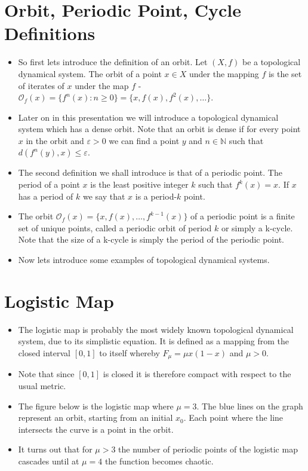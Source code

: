 \documentclass{article}
\begin{document}
    \section{Orbit, Periodic Point, Cycle Definitions}
    \begin{itemize}
        \item So first lets introduce the definition of an orbit. Let $(X, f)$ be a topological dynamical system. The orbit of a point $x \in X$ under the mapping $f$ is the set of iterates of $x$ under the map $f$ - $\mathcal{O}_f(x) = \lbrace f^n(x) : n \geq 0 \rbrace = \lbrace x, f(x), f^2(x), \dots \rbrace$. 
        \item Later on in this presentation we will introduce a topological dynamical system which has a dense orbit. Note that an orbit is dense if for every point $x$ in the orbit and $\varepsilon > 0$ we can find a point $y$ and $n \in \mathbb{N}$ such that $d(f^n(y), x) \leq \varepsilon$.
        \item The second definition we shall introduce is that of a periodic point. The period of a point $x$ is the least positive integer $k$ such that $f^k(x) = x$. If $x$ has a period of $k$ we say that $x$ is a period-$k$ point.
        \item The orbit $\mathcal{O}_f(x) = \lbrace x, f(x), \dots, f^{k-1}(x) \rbrace$ of a periodic point is a finite set of unique points, called a periodic orbit of period $k$ or simply a k-cycle. Note that the size of a k-cycle is simply the period of the periodic point.
        \item Now lets introduce some examples of topological dynamical systems.
    \end{itemize}

    \section{Logistic Map}
    \begin{itemize}
        \item The logistic map is probably the most widely known topological dynamical system, due to its simplistic equation. It is defined as a mapping from the closed interval $[0, 1]$ to itself whereby $F_\mu = \mu x (1 - x)$ and $\mu > 0$.
        \item Note that since $[0, 1]$ is closed it is therefore compact with respect to the usual metric. 
        \item The figure below is the logistic map where $\mu = 3$. The blue lines on the graph represent an orbit, starting from an initial $x_0$. Each point where the line intersects the curve is a point in the orbit.
        \item It turns out that for $\mu > 3$ the number of periodic points of the logistic map cascades until at $\mu = 4$ the function becomes chaotic.
    \end{itemize}
\end{document}
